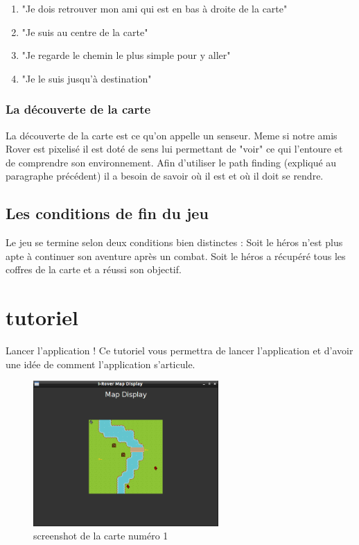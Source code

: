 \documentclass[a4paper 12pts]{article}
\begin{document}
\begin{enumerate}
\item "Je dois retrouver mon ami qui est en bas à droite de la carte"
\item "Je suis au centre de la carte"
\item "Je regarde le chemin le plus simple pour y aller"
\item "Je le suis jusqu'à destination"
\end{enumerate}

\vspace{0.75cm}

\subsubsection{La découverte de la carte}

\vspace{0.75cm}

La découverte de la carte est ce qu'on appelle un senseur.
Meme si notre amis Rover est pixelisé il est doté de sens lui permettant de "voir" ce qui l'entoure et de comprendre son environnement.
Afin d'utiliser le path finding (expliqué au paragraphe précédent) il a besoin de savoir où il est et où il doit se rendre.

\vspace{0.75cm}

\subsection{Les conditions de fin du jeu}

\vspace{0.75cm}

Le jeu se termine selon deux conditions bien distinctes :
Soit le héros n'est plus apte à continuer son aventure après un combat.
Soit le héros a récupéré tous les coffres de la carte et a réussi son objectif.

\newpage

\section{tutoriel}
\vspace{0.55cm}

Lancer l'application !
Ce tutoriel vous permettra de lancer l'application et d'avoir une idée de comment l'application s'articule.

\vspace{0.25cm}
\begin{figure}[h]
   \includegraphics[width=200pt]{Illustration/screens/screen1.png}
	\caption{screenshot de la carte numéro 1}
\end{figure}
\end{document}
